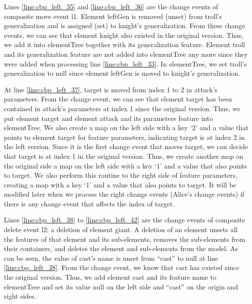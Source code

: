 Lines \ref{line:cbp_left_35} and \ref{line:cbp_left_36} are the change events of composite move event \textsf{l1}. Element \textsf{leftGen} is removed (unset) from \textsf{troll}’s \textsf{generalization} and is assigned (set) to \textsf{knight}’s \textsf{generalization}. From these change events, we can see that element \textsf{knight} also existed in the original version. Thus, we add it into \textsf{elementTree} together with its \textsf{generalization} feature. Element \textsf{troll} and its \textsf{generalization} feature are not added into \textsf{elementTree} any more since they were added when processing line \ref{line:cbp_left_33}. In \textsf{elementTree}, we set \textsf{troll}’s \textsf{generalization} to null since element \textsf{leftGen} is moved to \textsf{knight}’s \textsf{generalization}.

At line \ref{line:cbp_left_37}, \textsf{target} is moved from index 1 to 2 in \textsf{attack}’s \textsf{parameters}. From the change event, we can see that element \textsf{target} has been contained in \textsf{attack}’s \textsf{parameters} at index 1 since the original version. Thus, we put element \textsf{target} and element \textsf{attack} and its \textsf{parameters} feature into \textsf{elementTree}. We also create a map on the left side with a key ‘2’ and a value that points to element \textsf{target} for feature \textsf{parameters}, indicating \textsf{target} is at index 2 in the left version. Since it is the first change event that moves \textsf{target}, we can decide that \textsf{target} is at index 1 in the original version. Thus, we create another map on the original side a map on the left side with a key ‘1’ and a value that also points to \textsf{target}. We also perform this routine to the right side of feature \textsf{parameters}, creating a map with a key ‘1’ and a value that also points to \textsf{target}. It will be modified later when we process the right change events (Alice’s change events) if there is any change event that affects the index of \textsf{target}.

Lines \ref{line:cbp_left_38} to \ref{line:cbp_left_42} are the change events of composite delete event \textsf{l2}; a deletion of element \textsf{giant}.
A deletion of an element unsets all the features of that element and its sub-elements, removes the sub-elements from their containers, and deletes the element and sub-elements from the model.
As can be seen, the value of \textsf{cast}’s \textsf{name} is unset from “cast” to null at line \ref{line:cbp_left_38}. From the change event, we know that cast has existed since the original version. Thus, we add element \textsf{cast} and its feature \textsf{name} to \textsf{elementTree} and set its value null on the left side and “cast” on the origin and right sides.


